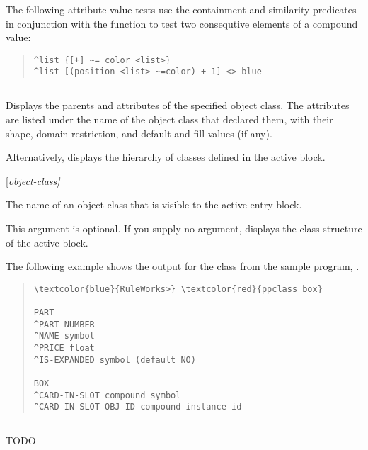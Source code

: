 {{The following attribute-value tests use the containment and
similarity predicates in conjunction with the 
function to test two consequtive elements of a compound
value:
\begin{quote}
\begin{verbatim}
^list {[+] ~= color <list>}
^list [(position <list> ~=color) + 1] <> blue
\end{verbatim}
\end{quote}


\subsection{}

Displays the parents and attributes of the specified object class. The
attributes are listed under the name of the object class that declared
them, with their shape, domain restriction, and default and fill
values (if any).

Alternatively, displays the hierarchy of classes defined in the active
block.

\Format

 [\it{object-class}]

\begin{argument}
\item[object-class]

  The name of an object class that is visible to the active entry
  block.

  This argument is optional. If you supply no argument, 
  displays the class structure of the active block.
\end{argument}

\Example

The following example shows the  output for the class
 from the sample program, .

\begin{quote}
\begin{Verbatim}[commandchars=\\\{\}]
\textcolor{blue}{RuleWorks>} \textcolor{red}{ppclass box}

PART
^PART-NUMBER
^NAME symbol
^PRICE float
^IS-EXPANDED symbol (default NO)

BOX
^CARD-IN-SLOT compound symbol
^CARD-IN-SLOT-OBJ-ID compound instance-id
\end{Verbatim}
\end{quote}

\subsection{}
TODO

}}
